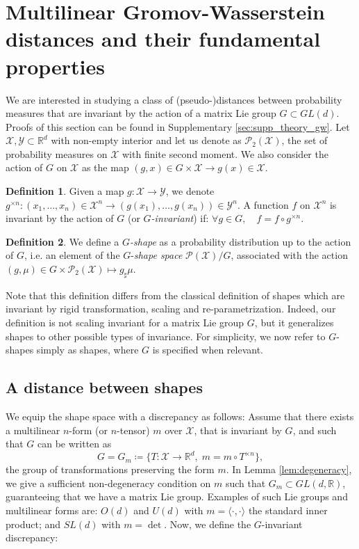 \documentclass{article}
\newcommand{\R}{\mathbb{R}}
\newcommand{\Y}{\mathcal{Y}}
\newcommand{\X}{\mathcal{X}}
\newcommand{\1}{\mathbf{1}}
\renewcommand{\P}{\mathcal{P}}
\theoremstyle{definition}
\newtheorem{definition}{Definition}
\theoremstyle{remark}
\begin{document}
\section{Multilinear Gromov-Wasserstein distances and their fundamental properties}\label{sec:theory}
We are interested in studying a class of (pseudo-)distances between probability measures that are invariant by the action of a matrix Lie group $G\subset GL(d)$. Proofs of this section can be found in Supplementary \ref{sec:supp_theory_gw}. Let $\X,\Y\subset\R^d$ with non-empty interior and let us denote as $\P_2(\X)$, the set of probability measures on $\X$ with finite second moment. We also consider the action of $G$ on $\X$ as the map $(g,x)\in G\times\X\to g(x)\in \X$.
\begin{definition} 
    Given a map $g:\X\to\Y$, we denote $g^{\times n}: (x_1,\dots, x_n)\in \X^n\to (g(x_1),\dots, g(x_n))\in \Y^n$. A function $f$ on $\X^n$ is  invariant by the action of $G$  (or \emph{$G$-invariant}) if: $\forall  g\in G,\quad f = f\circ g^{\times n}$.
\end{definition}

\begin{definition}
    We define a \emph{$G$-shape} as a probability distribution up to the action of $G$, i.e. an element of the $G$-\emph{shape space} $\P(\X)/G$, associated with the action $(g,\mu)\in G\times\P_2(\X)\mapsto g_{\sharp}\mu$.
\end{definition}
Note that this definition differs from the classical definition of shapes \cite{ dryden2016statistical,kendall2009shape} which are invariant by  rigid transformation, scaling and re-parametrization. Indeed, our definition is not scaling invariant for a matrix Lie group $G$, but it generalizes shapes to other possible types of invariance. For simplicity, we now refer to $G$-shapes simply as shapes, where $G$ is specified when relevant.

\subsection{A distance between shapes}\label{sec:GW_dist} 
 We equip the shape space with a discrepancy as follows: Assume that there exists  a multilinear $n$-form (or $n$-tensor) $m$ over $\X$, that is invariant by $G$, and such that $G$ can be written as 
 \[G=G_{m} \coloneqq \{T:\X\to\R^d,\;  m  = m\circ T^{\times n}\},\]
 the group of transformations preserving the form $m$.  In Lemma \ref{lem:degeneracy}, we give a sufficient non-degeneracy condition on $m$ such that $G_{m}\subset GL(d,\R)$, guaranteeing that we have a matrix Lie group. Examples of such Lie groups and multilinear forms are: $O(d)$ and $U(d)$  with $m=\langle\cdot,\cdot\rangle$ the standard inner product; and $SL(d)$ with $m=\det$. Now, we define the $G$-invariant discrepancy:
\end{document}
